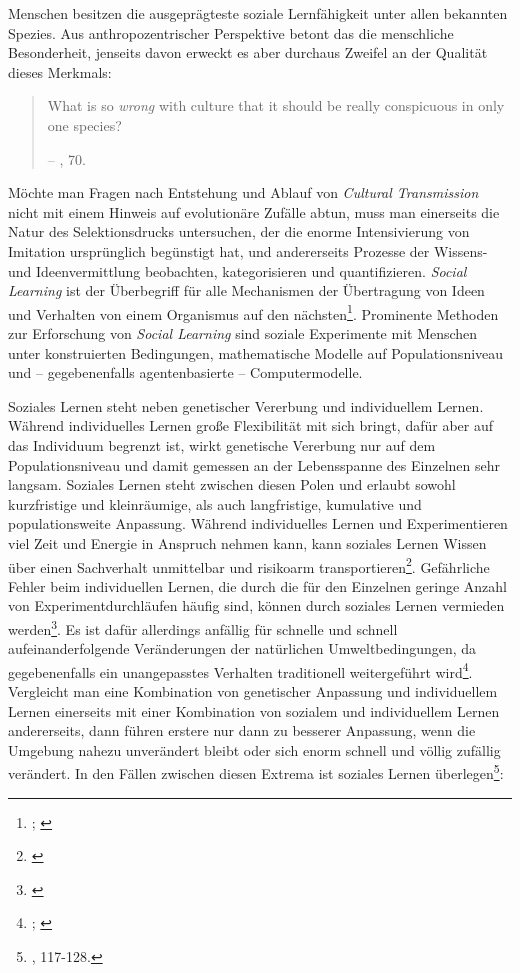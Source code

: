 \documentclass[openany,twoside,twocolumn]{book}
\let\rmarkdownfootnote\footnote%
\def\footnote{\protect\rmarkdownfootnote}
\begin{document}
Menschen besitzen die ausgeprägteste soziale Lernfähigkeit unter allen bekannten Spezies. Aus anthropozentrischer Perspektive betont das die menschliche Besonderheit, jenseits davon erweckt es aber durchaus Zweifel an der Qualität dieses Merkmals:

\begin{quote}
What is so \emph{wrong} with culture that it should be really conspicuous in only one species?

-- \textcite{smith_cultural_1992}, 70.
\end{quote}

Möchte man Fragen nach Entstehung und Ablauf von \emph{Cultural Transmission} nicht mit einem Hinweis auf evolutionäre Zufälle abtun, muss man einerseits die Natur des Selektionsdrucks untersuchen, der die enorme Intensivierung von Imitation ursprünglich begünstigt hat, und andererseits Prozesse der Wissens- und Ideenvermittlung beobachten, kategorisieren und quantifizieren. \emph{Social Learning} ist der Überbegriff für alle Mechanismen der Übertragung von Ideen und Verhalten von einem Organismus auf den nächsten\footnote{\textcite{eerkens_cultural_2007}; \textcite{rendell_cognitive_2011}}. Prominente Methoden zur Erforschung von \emph{Social Learning} sind soziale Experimente mit Menschen unter konstruierten Bedingungen, mathematische Modelle auf Populationsniveau und -- gegebenenfalls agentenbasierte -- Computermodelle.

Soziales Lernen steht neben genetischer Vererbung und individuellem Lernen. Während individuelles Lernen große Flexibilität mit sich bringt, dafür aber auf das Individuum begrenzt ist, wirkt genetische Vererbung nur auf dem Populationsniveau und damit gemessen an der Lebensspanne des Einzelnen sehr langsam. Soziales Lernen steht zwischen diesen Polen und erlaubt sowohl kurzfristige und kleinräumige, als auch langfristige, kumulative und populationsweite Anpassung. Während individuelles Lernen und Experimentieren viel Zeit und Energie in Anspruch nehmen kann, kann soziales Lernen Wissen über einen Sachverhalt unmittelbar und risikoarm transportieren\footnote{\textcite{rendell_rogers_2010}}. Gefährliche Fehler beim individuellen Lernen, die durch die für den Einzelnen geringe Anzahl von Experimentdurchläufen häufig sind, können durch soziales Lernen vermieden werden\footnote{\textcite{boyd_evolution_1988}}. Es ist dafür allerdings anfällig für schnelle und schnell aufeinanderfolgende Veränderungen der natürlichen Umweltbedingungen, da gegebenenfalls ein unangepasstes Verhalten traditionell weitergeführt wird\footnote{\textcite{rogers_does_1988}; \textcite{spencer_human_1993}}. Vergleicht man eine Kombination von genetischer Anpassung und individuellem Lernen einerseits mit einer Kombination von sozialem und individuellem Lernen andererseits, dann führen erstere nur dann zu besserer Anpassung, wenn die Umgebung nahezu unverändert bleibt oder sich enorm schnell und völlig zufällig verändert. In den Fällen zwischen diesen Extrema ist soziales Lernen überlegen\footnote{\textcite{boyd_culture_1985}, 117-128.}:
\end{document}
